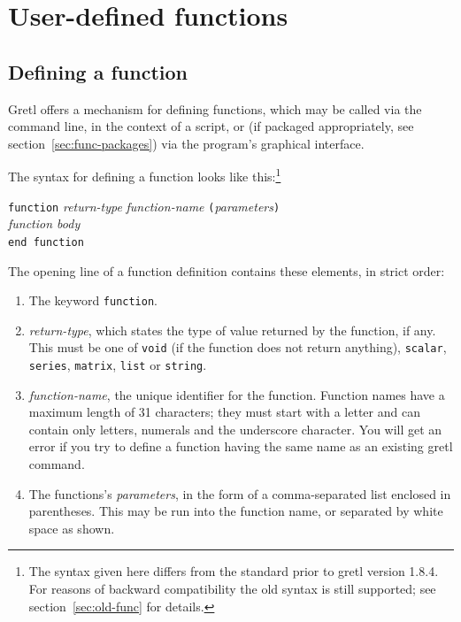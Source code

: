 \chapter{User-defined functions}
\label{chap:functions}

\section{Defining a function}
\label{func-define}

Gretl offers a mechanism for defining functions, which may be
called via the command line, in the context of a script, or (if
packaged appropriately, see section~\ref{sec:func-packages}) via the
program's graphical interface.

The syntax for defining a function looks like this:\footnote{The
  syntax given here differs from the standard prior to gretl
  version 1.8.4.  For reasons of backward compatibility the old syntax
  is still supported; see section~\ref{sec:old-func} for details.}

\begin{raggedright}
\texttt{function} \textsl{return-type} \textsl{function-name}
\texttt{(}\textsl{parameters}\texttt{)} \\
\qquad  \textsl{function body} \\
\texttt{end function}
\end{raggedright}

The opening line of a function definition contains these elements, in
strict order:

\begin{enumerate}
\item The keyword \texttt{function}.
\item \textsl{return-type}, which states the type of value returned by
  the function, if any.  This must be one of \texttt{void} (if the
  function does not return anything), \texttt{scalar},
  \texttt{series}, \texttt{matrix}, \texttt{list} or \texttt{string}.
\item \textsl{function-name}, the unique identifier for the function.
  Function names have a maximum length of 31 characters; they must
  start with a letter and can contain only letters, numerals and the
  underscore character.  You will get an error if you try to define a
  function having the same name as an existing gretl command.
\item The functions's \textsl{parameters}, in the form of a
  comma-separated list enclosed in parentheses.  This may be run
  into the function name, or separated by white space as shown.
\end{enumerate}

